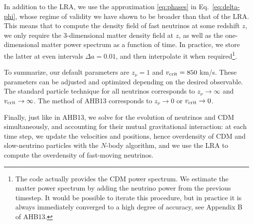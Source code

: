 \documentclass[useAMS, usenatbib]{mnras}
\begin{document}
In addition to the LRA, we use the approximation \eqref{eq:phases} in Eq.~\eqref{eq:delta-phi}, whose regime of validity we have shown to be broader than that of the LRA. This means that to compute the density field of fast neutrinos at some redshift $z$, we only require the 3-dimensional matter density field at $z$, as well as the one-dimensional matter power spectrum as a function of time. In practice, we store the latter at even intervals $\Delta a = 0.01$, and then interpolate it when required\footnote{The code actually provides the CDM power spectrum. We estimate the matter power spectrum by adding the neutrino power from the previous timestep. It would be possible to iterate this procedure, but in practice it is always immediately converged to a high degree of accuracy, see Appendix B of AHB13.}.

To summarize, our default parameters are $z_\nu = 1$ and $v_{\rm crit} = 850$ km/s. These parameters can be adjusted and optimized depending on the desired observable. The standard particle technique for all neutrinos corresponds to $z_\nu \rightarrow \infty$ and $v_{\rm crit} \rightarrow \infty$. The method of AHB13 corresponds to $z_\nu \rightarrow 0$ or $v_{\rm crit} \rightarrow 0$.

Finally, just like in AHB13, we solve for the evolution of neutrinos and CDM simultaneously, and accounting for their mutual gravitational interaction: at each time step, we update the velocities and positions, hence overdensity of CDM and slow-neutrino particles with the $N$-body algorithm, and we use the LRA to compute the overdensity of fast-moving neutrinos.

\end{document}
